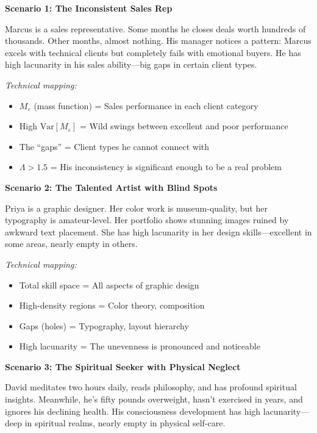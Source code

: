 \documentclass[11pt,twoside]{book}
\newcommand{\Lacunarity}{\Lambda}
\begin{document}
\begin{tcolorbox}[colback=yellow!5!white,colframe=yellow!65!black,title=\textbf{Real-Life Scenarios: High Lacunarity},breakable]

\textbf{Scenario 1: The Inconsistent Sales Rep}

Marcus is a sales representative. Some months he closes deals worth hundreds of thousands. Other months, almost nothing. His manager notices a pattern: Marcus excels with technical clients but completely fails with emotional buyers. He has high lacunarity in his sales ability---big gaps in certain client types.

\textit{Technical mapping:}
\begin{itemize}
    \item $M_\varepsilon$ (mass function) = Sales performance in each client category
    \item High $\mathrm{Var}[M_\varepsilon]$ = Wild swings between excellent and poor performance
    \item The ``gaps'' = Client types he cannot connect with
    \item $\Lacunarity > 1.5$ = His inconsistency is significant enough to be a real problem
\end{itemize}

\textbf{Scenario 2: The Talented Artist with Blind Spots}

Priya is a graphic designer. Her color work is museum-quality, but her typography is amateur-level. Her portfolio shows stunning images ruined by awkward text placement. She has high lacunarity in her design skills---excellent in some areas, nearly empty in others.

\textit{Technical mapping:}
\begin{itemize}
    \item Total skill space = All aspects of graphic design
    \item High-density regions = Color theory, composition
    \item Gaps (holes) = Typography, layout hierarchy
    \item High lacunarity = The unevenness is pronounced and noticeable
\end{itemize}

\textbf{Scenario 3: The Spiritual Seeker with Physical Neglect}

David meditates two hours daily, reads philosophy, and has profound spiritual insights. Meanwhile, he's fifty pounds overweight, hasn't exercised in years, and ignores his declining health. His consciousness development has high lacunarity---deep in spiritual realms, nearly empty in physical self-care.


\end{tcolorbox}
\end{document}
